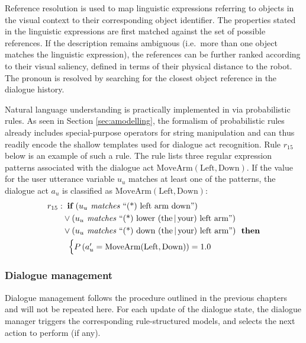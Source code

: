 Reference resolution is used to map linguistic expressions referring to objects in the visual context to their corresponding object identifier. The properties stated in the linguistic expressions are first matched against the set of possible references.  If the description remains ambiguous (i.e.\ more than one object matches the linguistic expression), the references can be further ranked according to their visual saliency, defined in terms of their physical distance to the robot.  The pronoun  is resolved by searching for the closest object reference in the dialogue history. 

Natural language understanding is practically implemented in \opendial{} via probabilistic rules.  As seen in Section \ref{sec:amodelling}, the formalism of probabilistic rules already includes special-purpose operators for string manipulation and can thus readily encode the shallow templates used for dialogue act recognition.  Rule $r_{15}$ below is an example of such a rule.  The rule lists three regular expression patterns associated with the dialogue act $\mathrm{MoveArm(Left,Down)}$.  If the value for the user utterance variable $u_u$ matches at least one of the patterns, the dialogue act $a_u$ is classified as $\mathrm{MoveArm(Left,Down)}$:
\begin{align*}
r_{15}: &\;\;\textbf{if} \ (u_u \textit{ matches } \text{``(*) left arm down''} ) \\ 
& \lor (u_u \textit{ matches } \text{``(*) lower (the\,|\,your) left arm''} ) \\
& \lor (u_u \textit{ matches } \text{``(*) down (the\,|\,your) left arm''}   )  \ \ \textbf{then} \\ 
& \; \; \begin{cases} P\left(a_u' = \mathrm{MoveArm(Left,Down)}\right) = 1.0 \end{cases}
\end{align*}

\subsubsection*{Dialogue management}

Dialogue management follows the procedure outlined in the previous chapters and will not be repeated here. For each update of the dialogue state, the dialogue manager triggers the corresponding rule-structured models, and selects the next action to perform (if any). 

